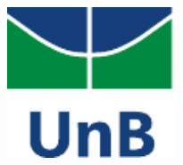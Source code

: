 \begin{titlepage}
\includegraphics[width=5cm,height=5cm,keepaspectratio]{img/unb_vert.pdf}\\[1cm] %
 

\vfill %

\end{titlepage}
